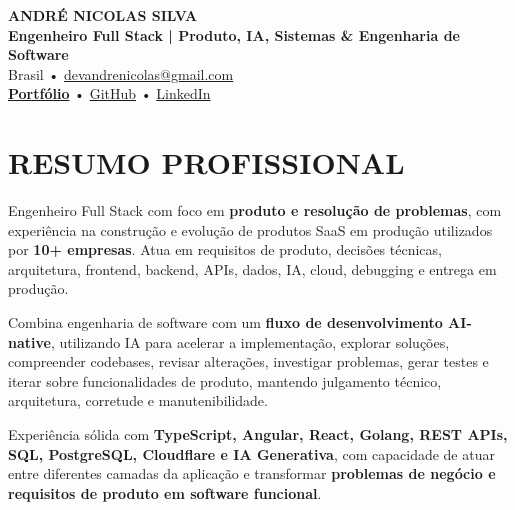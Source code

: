 \documentclass[10pt,a4paper]{article}
\begin{document}

\begin{center}

    {\LARGE \textbf{ANDRÉ NICOLAS SILVA}} \\[-2pt]

    {\normalsize \textbf{Engenheiro Full Stack | Produto, IA, Sistemas \& Engenharia de Software}} \\[1pt]

    \footnotesize
    Brasil \quad • \quad
    \href{mailto:devandrenicolas@gmail.com}{devandrenicolas@gmail.com} \\[-1pt]

    \textbf{\href{https://portfolio-andrenicolas.vercel.app}{Portfólio}}
    \quad • \quad
    \href{https://github.com/devAndreNicolas}{GitHub}
    \quad • \quad
    \href{https://www.linkedin.com/in/devandrenicolas}{LinkedIn}

\end{center}

\vspace{-3pt}


\section*{RESUMO PROFISSIONAL}

\footnotesize

Engenheiro Full Stack com foco em \textbf{produto e resolução de
problemas}, com experiência na construção e evolução de produtos SaaS
em produção utilizados por \textbf{10+ empresas}. Atua em requisitos
de produto, decisões técnicas, arquitetura, frontend, backend, APIs,
dados, IA, cloud, debugging e entrega em produção.

Combina engenharia de software com um \textbf{fluxo de desenvolvimento
AI-native}, utilizando IA para acelerar a implementação, explorar
soluções, compreender codebases, revisar alterações, investigar
problemas, gerar testes e iterar sobre funcionalidades de produto,
mantendo julgamento técnico, arquitetura, corretude e
manutenibilidade.

Experiência sólida com \textbf{TypeScript, Angular, React, Golang,
REST APIs, SQL, PostgreSQL, Cloudflare e IA Generativa}, com capacidade
de atuar entre diferentes camadas da aplicação e transformar
\textbf{problemas de negócio e requisitos de produto em software
funcional}.
\end{document}
